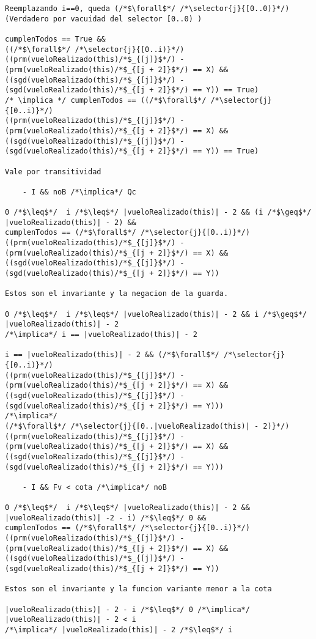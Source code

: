 \begin{lstlisting}
Reemplazando i==0, queda (/*$\forall$*/ /*\selector{j}{[0..0)}*/) (Verdadero por vacuidad del selector [0..0) )

cumplenTodos == True && 
((/*$\forall$*/ /*\selector{j}{[0..i)}*/) ((prm(vueloRealizado(this)/*$_{[j]}$*/) - (prm(vueloRealizado(this)/*$_{[j + 2]}$*/) == X) &&
((sgd(vueloRealizado(this)/*$_{[j]}$*/) - (sgd(vueloRealizado(this)/*$_{[j + 2]}$*/) == Y)) == True)
/* \implica */ cumplenTodos == ((/*$\forall$*/ /*\selector{j}{[0..i)}*/)
((prm(vueloRealizado(this)/*$_{[j]}$*/) - (prm(vueloRealizado(this)/*$_{[j + 2]}$*/) == X) &&
((sgd(vueloRealizado(this)/*$_{[j]}$*/) - (sgd(vueloRealizado(this)/*$_{[j + 2]}$*/) == Y)) == True)

Vale por transitividad

	- I && noB /*\implica*/ Qc

0 /*$\leq$*/  i /*$\leq$*/ |vueloRealizado(this)| - 2 && (i /*$\geq$*/ |vueloRealizado(this)| - 2) && 
cumplenTodos == (/*$\forall$*/ /*\selector{j}{[0..i)}*/)
((prm(vueloRealizado(this)/*$_{[j]}$*/) - (prm(vueloRealizado(this)/*$_{[j + 2]}$*/) == X) &&
((sgd(vueloRealizado(this)/*$_{[j]}$*/) - (sgd(vueloRealizado(this)/*$_{[j + 2]}$*/) == Y)) 

Estos son el invariante y la negacion de la guarda.

0 /*$\leq$*/  i /*$\leq$*/ |vueloRealizado(this)| - 2 && i /*$\geq$*/ |vueloRealizado(this)| - 2 
/*\implica*/ i == |vueloRealizado(this)| - 2

i == |vueloRealizado(this)| - 2 && (/*$\forall$*/ /*\selector{j}{[0..i)}*/)
((prm(vueloRealizado(this)/*$_{[j]}$*/) - (prm(vueloRealizado(this)/*$_{[j + 2]}$*/) == X) &&
((sgd(vueloRealizado(this)/*$_{[j]}$*/) - (sgd(vueloRealizado(this)/*$_{[j + 2]}$*/) == Y)))
/*\implica*/ 
(/*$\forall$*/ /*\selector{j}{[0..|vueloRealizado(this)| - 2)}*/)
((prm(vueloRealizado(this)/*$_{[j]}$*/) - (prm(vueloRealizado(this)/*$_{[j + 2]}$*/) == X) &&
((sgd(vueloRealizado(this)/*$_{[j]}$*/) - (sgd(vueloRealizado(this)/*$_{[j + 2]}$*/) == Y)))

	- I && Fv < cota /*\implica*/ noB

0 /*$\leq$*/  i /*$\leq$*/ |vueloRealizado(this)| - 2 && |vueloRealizado(this)| -2 - i) /*$\leq$*/ 0 &&
cumplenTodos == (/*$\forall$*/ /*\selector{j}{[0..i)}*/)
((prm(vueloRealizado(this)/*$_{[j]}$*/) - (prm(vueloRealizado(this)/*$_{[j + 2]}$*/) == X) &&
((sgd(vueloRealizado(this)/*$_{[j]}$*/) - (sgd(vueloRealizado(this)/*$_{[j + 2]}$*/) == Y))  

Estos son el invariante y la funcion variante menor a la cota

|vueloRealizado(this)| - 2 - i /*$\leq$*/ 0 /*\implica*/ |vueloRealizado(this)| - 2 < i 
/*\implica*/ |vueloRealizado(this)| - 2 /*$\leq$*/ i 



\end{lstlisting}
